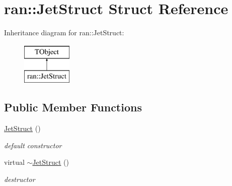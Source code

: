 \hypertarget{structran_1_1JetStruct}{\section{ran\-:\-:Jet\-Struct Struct Reference}
\label{structran_1_1JetStruct}
}
Inheritance diagram for ran\-:\-:Jet\-Struct\-:\begin{figure}[H]
\begin{center}
\leavevmode
\includegraphics[height=2.000000cm]{structran_1_1JetStruct}
\end{center}
\end{figure}
\subsection*{Public Member Functions}
\begin{DoxyCompactItemize}
\item 
\hypertarget{structran_1_1JetStruct_a080ad77c3499f07562a6409e915beac5}{\hyperlink{structran_1_1JetStruct_a080ad77c3499f07562a6409e915beac5}{Jet\-Struct} ()}\label{structran_1_1JetStruct_a080ad77c3499f07562a6409e915beac5}

\begin{DoxyCompactList}\small\item\em default constructor \end{DoxyCompactList}\item 
\hypertarget{structran_1_1JetStruct_a57e72fe40bf4a2757825da6b8eb703ba}{virtual \hyperlink{structran_1_1JetStruct_a57e72fe40bf4a2757825da6b8eb703ba}{$\sim$\-Jet\-Struct} ()}\label{structran_1_1JetStruct_a57e72fe40bf4a2757825da6b8eb703ba}

\begin{DoxyCompactList}\small\item\em destructor \end{DoxyCompactList}\end{DoxyCompactItemize}

